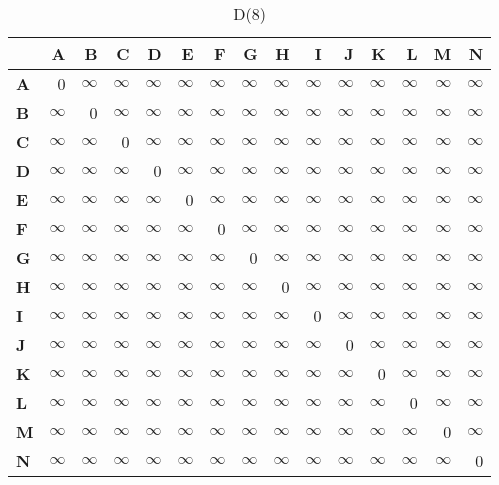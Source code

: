 \documentclass{article}
\newcommand{\INF}{$\infty$}
\begin{document}
\begin{table}[H]\centering
\caption{D(8)}
\begin{tabular}{l r r r r r r r r r r r r r r}
\toprule
 & \textbf{A} & \textbf{B} & \textbf{C} & \textbf{D} & \textbf{E} & \textbf{F} & \textbf{G} & \textbf{H} & \textbf{I} & \textbf{J} & \textbf{K} & \textbf{L} & \textbf{M} & \textbf{N}\\\midrule
\textbf{A} & 0 & \INF & \INF & \INF & \INF & \INF & \INF & \INF & \INF & \INF & \INF & \INF & \INF & \INF \\
\textbf{B} & \INF & 0 & \INF & \INF & \INF & \INF & \INF & \INF & \INF & \INF & \INF & \INF & \INF & \INF \\
\textbf{C} & \INF & \INF & 0 & \INF & \INF & \INF & \INF & \INF & \INF & \INF & \INF & \INF & \INF & \INF \\
\textbf{D} & \INF & \INF & \INF & 0 & \INF & \INF & \INF & \INF & \INF & \INF & \INF & \INF & \INF & \INF \\
\textbf{E} & \INF & \INF & \INF & \INF & 0 & \INF & \INF & \INF & \INF & \INF & \INF & \INF & \INF & \INF \\
\textbf{F} & \INF & \INF & \INF & \INF & \INF & 0 & \INF & \INF & \INF & \INF & \INF & \INF & \INF & \INF \\
\textbf{G} & \INF & \INF & \INF & \INF & \INF & \INF & 0 & \INF & \INF & \INF & \INF & \INF & \INF & \INF \\
\textbf{H} & \INF & \INF & \INF & \INF & \INF & \INF & \INF & 0 & \INF & \INF & \INF & \INF & \INF & \INF \\
\textbf{I} & \INF & \INF & \INF & \INF & \INF & \INF & \INF & \INF & 0 & \INF & \INF & \INF & \INF & \INF \\
\textbf{J} & \INF & \INF & \INF & \INF & \INF & \INF & \INF & \INF & \INF & 0 & \INF & \INF & \INF & \INF \\
\textbf{K} & \INF & \INF & \INF & \INF & \INF & \INF & \INF & \INF & \INF & \INF & 0 & \INF & \INF & \INF \\
\textbf{L} & \INF & \INF & \INF & \INF & \INF & \INF & \INF & \INF & \INF & \INF & \INF & 0 & \INF & \INF \\
\textbf{M} & \INF & \INF & \INF & \INF & \INF & \INF & \INF & \INF & \INF & \INF & \INF & \INF & 0 & \INF \\
\textbf{N} & \INF & \INF & \INF & \INF & \INF & \INF & \INF & \INF & \INF & \INF & \INF & \INF & \INF & 0 \\
\bottomrule
\end{tabular}
\end{table}
\end{document}
